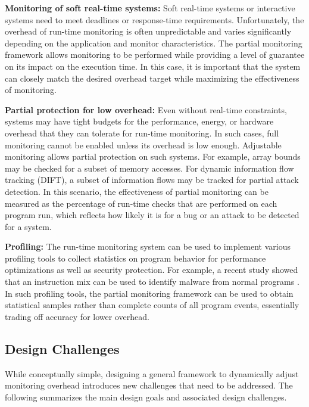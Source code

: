 {\bf Monitoring of soft real-time systems:}
Soft real-time systems or interactive systems need to meet deadlines or response-time
requirements. Unfortunately, the overhead of run-time monitoring is often 
unpredictable and varies significantly depending on the application and monitor
characteristics. The partial monitoring framework allows monitoring to be performed
while providing a level of guarantee on its impact on the execution time. 
In this case, it is important that the system can closely match the desired
overhead target while maximizing the effectiveness of monitoring.

{\bf Partial protection for low overhead:}
Even without real-time constraints, systems may have tight budgets for the performance,
energy, or hardware overhead that they can tolerate for run-time monitoring. In such cases,
full monitoring cannot be enabled unless its overhead is low enough. Adjustable
monitoring allows partial protection on such systems. For example, array bounds
may be checked for a subset of memory accesses. For dynamic information flow tracking (DIFT), a subset of information flows
may be tracked for partial attack detection. In this scenario, the effectiveness of 
partial monitoring can be measured as the percentage of run-time checks that are
performed on each program run, which reflects how likely it is for a bug or an attack 
to be detected for a system. 

{\bf Profiling:} 
The run-time monitoring system can be used to implement various profiling tools
to collect statistics on program behavior for performance optimizations as well
as security protection. For example, a recent study showed that an instruction
mix can be used to identify malware from normal programs \cite{demme-isca13, tang-raid14}. 
In such profiling tools, the partial monitoring framework can be used to obtain
statistical samples rather than complete counts of all program events, essentially trading off
accuracy for lower overhead.

\subsection{Design Challenges}

While conceptually simple, designing a general framework to dynamically adjust monitoring
overhead introduces new challenges that need to be addressed.  
The following summarizes the main design goals and associated design challenges.


